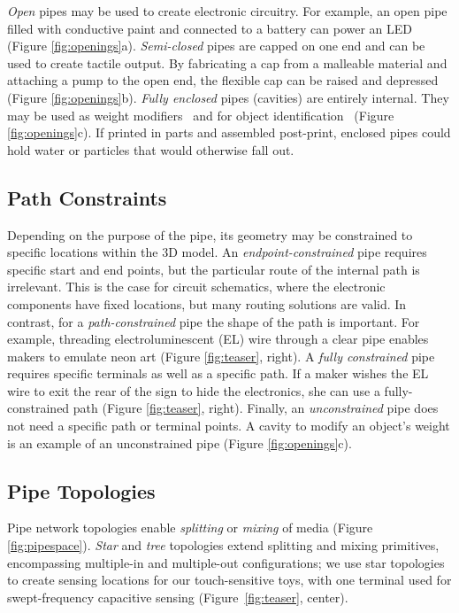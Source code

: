 \emph{Open} pipes may be used to create electronic circuitry.  For example, an open pipe filled with conductive paint and connected to a battery can power an LED (Figure \ref{fig:openings}a).
%
\emph{Semi-closed} pipes are capped on one end and can be used to create tactile output. By fabricating a cap from a malleable material and attaching a pump to the open end, the flexible cap can be raised and depressed (Figure \ref{fig:openings}b).
%
\emph{Fully enclosed} pipes (cavities) are entirely internal.  They may be used as weight modifiers~\cite{Prevost-makeitstand} and for object identification~\cite{Willis-infrastructs} (Figure \ref{fig:openings}c).  If printed in parts and assembled post-print, enclosed pipes could hold water or particles that would otherwise fall out.


\subsection{Path Constraints}
Depending on the purpose of the pipe, its geometry may be constrained to specific locations within the 3D model. An \emph{endpoint-constrained} pipe requires specific start and end points, but the particular route of the internal path is irrelevant. This is the case for circuit schematics, where the electronic components have fixed locations, but many routing solutions are valid. In contrast, for a \emph{path-constrained} pipe the shape of the path is important. For example, threading electroluminescent (EL) wire through a clear pipe enables makers to emulate neon art (Figure \ref{fig:teaser}, right). A \emph{fully constrained} pipe requires specific terminals as well as a specific path. If a maker wishes the EL wire to exit the rear of the sign to hide the electronics, she can use a fully-constrained path (Figure \ref{fig:teaser}, right). Finally, an \emph{unconstrained} pipe does not need a specific path or terminal points. A cavity to modify an object's weight is an example of an unconstrained pipe (Figure \ref{fig:openings}c).

\subsection{Pipe Topologies}
Pipe network topologies enable \emph{splitting} or \emph{mixing} of media (Figure \ref{fig:pipespace}).  \emph{Star} and \emph{tree} topologies extend splitting and mixing primitives, encompassing multiple-in and multiple-out configurations; we use star topologies to create sensing locations for our touch-sensitive toys, with one terminal used for swept-frequency capacitive sensing (Figure~\ref{fig:teaser}, center).

